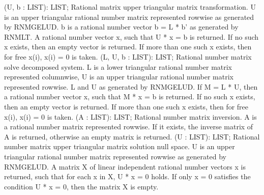  (U, b : LIST): LIST; \eproc
\bcom Rational matrix upper triangular matrix transformation.
U is an upper triangular rational number matrix represented rowwise
as generated by RNMGELUD. b is a rational number vector 
b = L * b' as generated by RNMLT. A rational number vector x, 
such that U * x = b is returned. If no such x exists, then an 
empty vector is returned. If more than one such x exists, then 
for free x(i), x(i) = 0 is taken.  \ecom 
{} (L, U, b : LIST): LIST; \eproc
\bcom Rational number matrix solve decomposed system.
L is a lower triangular rational number matrix represented 
columnwise, U is an upper triangular rational number matrix 
represented rowwise. L and U as generated by RNMGELUD.
If M = L * U, then a rational number vector x, such that 
M * x = b is returned. If no such x exists, then an empty 
vector is returned. If more than one such x exists, then 
for free x(i), x(i) = 0 is taken.  \ecom 
{} (A : LIST): LIST; \eproc
\bcom Rational number matrix inversion. A is a rational number matrix
represented rowwise. If it exists, the inverse matrix of A is 
returned, otherwise an empty matrix is returned.  \ecom 
{} (U : LIST): LIST; \eproc
\bcom Rational number matrix upper triangular matrix solution null space.
U is an upper triangular rational number matrix represented rowwise
as generated by RNMGELUD. A matrix X of linear independent rational 
number vectors x is returned, such that for each x in X, U * x = 0 holds. 
If only x = 0 satisfies the condition U * x = 0, then the 
matrix X is empty.  \ecom 
